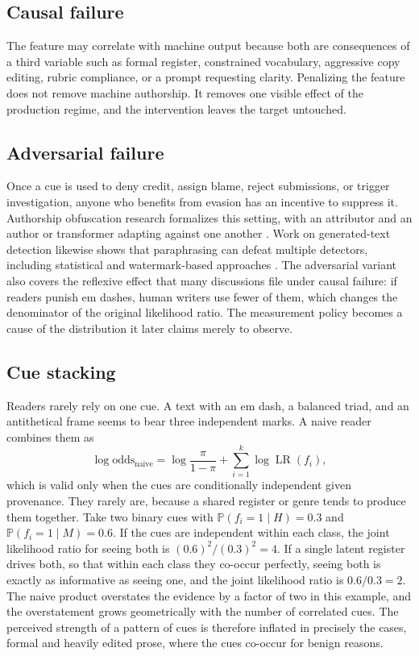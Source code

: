 \documentclass[11pt]{article}
\theoremstyle{plain}
\theoremstyle{definition}
\theoremstyle{remark}
\newcommand{\Pp}{\mathbb{P}}
\newcommand{\LR}{\operatorname{LR}}
\begin{document}
\subsection{Causal failure}

The feature may correlate with machine output because both are consequences of a third variable such as formal register, constrained vocabulary, aggressive copy editing, rubric compliance, or a prompt requesting clarity. Penalizing the feature does not remove machine authorship. It removes one visible effect of the production regime, and the intervention leaves the target untouched.

\subsection{Adversarial failure}

Once a cue is used to deny credit, assign blame, reject submissions, or trigger investigation, anyone who benefits from evasion has an incentive to suppress it. Authorship obfuscation research formalizes this setting, with an attributor and an author or transformer adapting against one another \cite{mahmood2020}. Work on generated-text detection likewise shows that paraphrasing can defeat multiple detectors, including statistical and watermark-based approaches \cite{krishna2023,sadasivan2023}. The adversarial variant also covers the reflexive effect that many discussions file under causal failure: if readers punish em dashes, human writers use fewer of them, which changes the denominator of the original likelihood ratio. The measurement policy becomes a cause of the distribution it later claims merely to observe.

\subsection{Cue stacking}

Readers rarely rely on one cue. A text with an em dash, a balanced triad, and an antithetical frame seems to bear three independent marks. A naive reader combines them as
\[
\log\text{odds}_{\text{naive}}
=
\log\frac{\pi}{1-\pi}+\sum_{i=1}^{k}\log\LR(f_i),
\]
which is valid only when the cues are conditionally independent given provenance. They rarely are, because a shared register or genre tends to produce them together. Take two binary cues with $\Pp(f_i{=}1\mid H)=0.3$ and $\Pp(f_i{=}1\mid M)=0.6$. If the cues are independent within each class, the joint likelihood ratio for seeing both is $(0.6)^2/(0.3)^2=4$. If a single latent register drives both, so that within each class they co-occur perfectly, seeing both is exactly as informative as seeing one, and the joint likelihood ratio is $0.6/0.3=2$. The naive product overstates the evidence by a factor of two in this example, and the overstatement grows geometrically with the number of correlated cues. The perceived strength of a pattern of cues is therefore inflated in precisely the cases, formal and heavily edited prose, where the cues co-occur for benign reasons.
\end{document}
